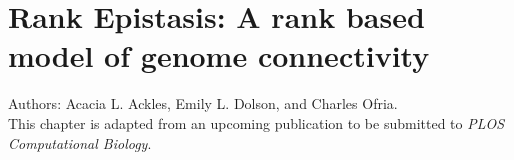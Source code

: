 \chapter{Rank Epistasis: A rank based model of genome connectivity}
\label{ch:re}

\noindent Authors: Acacia L. Ackles, Emily L. Dolson, and Charles Ofria. \\
This chapter is adapted from an upcoming publication to be submitted to \textit{PLOS Computational Biology}.







